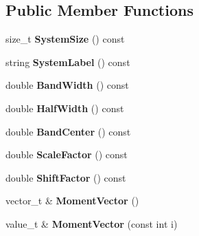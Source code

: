 \subsection*{Public Member Functions}
\begin{DoxyCompactItemize}
\item 
size\+\_\+t {\bfseries System\+Size} () const \hypertarget{classchebyshev_1_1_moments_a643ac4793661d07fb5468ccdbda4d274}{}\label{classchebyshev_1_1_moments_a643ac4793661d07fb5468ccdbda4d274}

\item 
string {\bfseries System\+Label} () const \hypertarget{classchebyshev_1_1_moments_aeae3162cd5f930affcc5b282c0ed2929}{}\label{classchebyshev_1_1_moments_aeae3162cd5f930affcc5b282c0ed2929}

\item 
double {\bfseries Band\+Width} () const \hypertarget{classchebyshev_1_1_moments_a7667fa18bec7c59417e558963fb0e3fd}{}\label{classchebyshev_1_1_moments_a7667fa18bec7c59417e558963fb0e3fd}

\item 
double {\bfseries Half\+Width} () const \hypertarget{classchebyshev_1_1_moments_abad9d579ade5250ca3aa29d643147a73}{}\label{classchebyshev_1_1_moments_abad9d579ade5250ca3aa29d643147a73}

\item 
double {\bfseries Band\+Center} () const \hypertarget{classchebyshev_1_1_moments_a79a6dc22ec1d546fda69aba33febcc2c}{}\label{classchebyshev_1_1_moments_a79a6dc22ec1d546fda69aba33febcc2c}

\item 
double {\bfseries Scale\+Factor} () const \hypertarget{classchebyshev_1_1_moments_affb049e07ebc8fe43d6ec2cde0771338}{}\label{classchebyshev_1_1_moments_affb049e07ebc8fe43d6ec2cde0771338}

\item 
double {\bfseries Shift\+Factor} () const \hypertarget{classchebyshev_1_1_moments_a29949dd338081832678a203a0c87ee82}{}\label{classchebyshev_1_1_moments_a29949dd338081832678a203a0c87ee82}

\item 
vector\+\_\+t \& {\bfseries Moment\+Vector} ()\hypertarget{classchebyshev_1_1_moments_aa26cda360676f86281c31ccb2340bd34}{}\label{classchebyshev_1_1_moments_aa26cda360676f86281c31ccb2340bd34}

\item 
value\+\_\+t \& {\bfseries Moment\+Vector} (const int i)\hypertarget{classchebyshev_1_1_moments_aa47e7c74c396d478940ef5dcf3d5e6ed}{}\label{classchebyshev_1_1_moments_aa47e7c74c396d478940ef5dcf3d5e6ed}


\end{DoxyCompactItemize}
